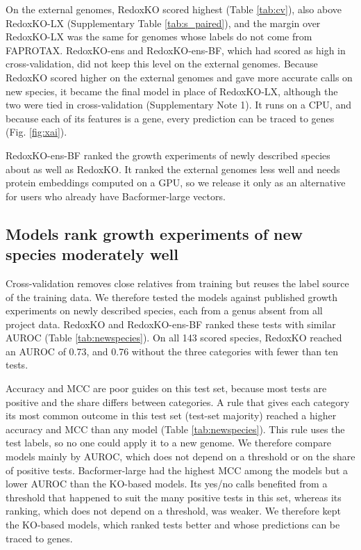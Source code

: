 \documentclass[10pt,a4paper,onecolumn]{article}
\begin{document}
On the external genomes, RedoxKO scored highest (Table \ref{tab:cv}),
also above RedoxKO-LX (Supplementary Table \ref{tab:s_paired}), and the
margin over RedoxKO-LX was the same for genomes whose labels do not come
from FAPROTAX. RedoxKO-ens and RedoxKO-ens-BF, which had scored as high
in cross-validation, did not keep this level on the external genomes.
Because RedoxKO scored higher on the external genomes and gave more
accurate calls on new species, it became the final model in place of
RedoxKO-LX, although the two were tied in cross-validation
(Supplementary Note 1). It runs on a CPU, and because each of its
features is a gene, every prediction can be traced to genes (Fig.
\ref{fig:xai}).

RedoxKO-ens-BF ranked the growth experiments of newly described species
about as well as RedoxKO. It ranked the external genomes less well and
needs protein embeddings computed on a GPU, so we release it only as an
alternative for users who already have Bacformer-large vectors.

\subsection{Models rank growth experiments of new species moderately
well}\label{models-rank-growth-experiments-of-new-species-moderately-well}

Cross-validation removes close relatives from training but reuses the
label source of the training data. We therefore tested the models
against published growth experiments on newly described species, each
from a genus absent from all project data. RedoxKO and RedoxKO-ens-BF
ranked these tests with similar AUROC (Table \ref{tab:newspecies}). On
all 143 scored species, RedoxKO reached an AUROC of 0.73, and 0.76
without the three categories with fewer than ten tests.

Accuracy and MCC are poor guides on this test set, because most tests
are positive and the share differs between categories. A rule that gives
each category its most common outcome in this test set (test-set
majority) reached a higher accuracy and MCC than any model (Table
\ref{tab:newspecies}). This rule uses the test labels, so no one could
apply it to a new genome. We therefore compare models mainly by AUROC,
which does not depend on a threshold or on the share of positive tests.
Bacformer-large had the highest MCC among the models but a lower AUROC
than the KO-based models. Its yes/no calls benefited from a threshold
that happened to suit the many positive tests in this set, whereas its
ranking, which does not depend on a threshold, was weaker. We therefore
kept the KO-based models, which ranked tests better and whose
predictions can be traced to genes.
\end{document}
